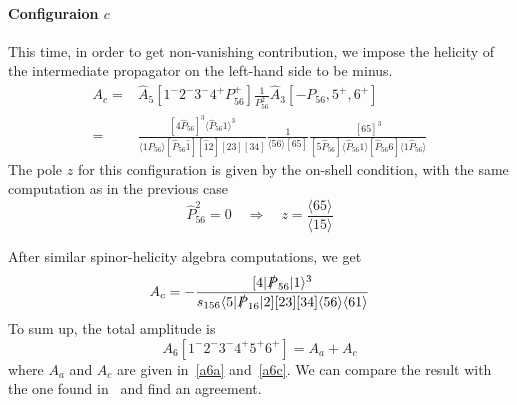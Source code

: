 \paragraph{Configuraion $c$}
This time, in order to get non-vanishing contribution, we impose the helicity of the intermediate propagator on the left-hand side to be minus.
\begin{equation}
\begin{split}
A_c = & \hat{A}_5[1^-2^-3^-4^+ P_{56}^+]\frac{1}{P_{56}^2}\hat{A}_3[-P_{56},5^+,6^+]
\\
= &
\frac{[4\hat{P}_{56}]^3\langle\hat{P}_{56}1\rangle^3}{\langle 1P_{56}\rangle [\hat{P}_{56}\hat{1}][\hat{1}2][23][34]}\frac{1}{\langle 56\rangle [65]}\frac{[65]^3}{[5\hat{P}_{56}]\langle \hat{P}_{56} 1\rangle [\hat{P}_{56} 6]\langle 1\hat{P}_{56}\rangle}
\end{split}
\end{equation}
The pole $z$ for this configuration is given by the on-shell condition, with the same computation as in the previous case
\begin{equation}
\hat{P}_{56}^2 = 0 \quad\Rightarrow\quad
z=\frac{\langle 65\rangle}{\langle 15\rangle}
\end{equation}
%
\iffalse
On the other hand
\begin{equation}
\begin{split}
& \langle 1\hat{P}_{56}\rangle [\hat{P}_{56}\hat{1}] = \langle 15 \rangle[51] + \langle 16\rangle[61] + z\langle 15 \rangle[56] = P_{156}^2
\\
& [5\hat{P}_{56}]\langle\hat{P}_{56} 1 \rangle = [56]\langle 61\rangle
\\
&
\langle 1 \hat{P}_{56}\rangle[\hat{P}_{56}6] =\langle 15\rangle[56]
\end{split}
\end{equation}
\fi
After similar spinor-helicity algebra computations, we get
\begin{equation}\label{a6c}
A_c = -\frac{[4|\slashed{P}_{56}|1\rangle^3}{s_{156}\langle 5|\slashed{P}_{16}|2][23][34]\langle 56\rangle\langle 61\rangle}
\end{equation}
To sum up, the total amplitude is
\begin{equation}
A_6[1^-2^-3^-4^+5^+6^+] = A_a + A_c
\end{equation}
where $A_a$ and $A_c$ are given in~\cref{a6a} and~\cref{a6c}.
We can compare the result with the one found in~\cite{Mangano:1990by} and find an agreement.
